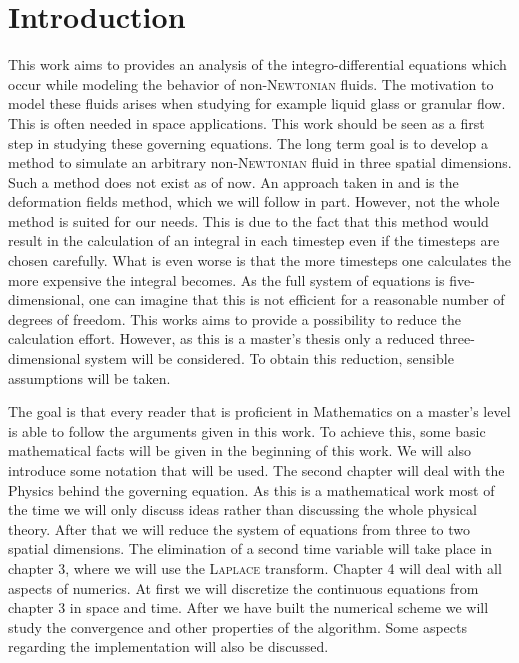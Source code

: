 \documentclass[12pt,a4paper,twoside, open=right]{scrreprt}
\theoremstyle{definition}
\theoremstyle{plain}
\begin{document}
\chapter{Introduction}
This work aims to provides an analysis of the integro-differential equations which occur while modeling the behavior of non-\textsc{Newtonian} fluids. The motivation to model these fluids arises when studying for example liquid glass or granular flow. This is often needed in space applications. This work should be seen as a first step in studying these governing equations. The long term goal is to develop a method to simulate an arbitrary non-\textsc{Newtonian} fluid in three spatial dimensions. Such a method does not exist as of now. An approach taken in \cite{Hulsen2001} and \cite{Hulsen2018} is the deformation fields method, which we will follow in part. However, not the whole method is suited for our needs. This is due to the fact that this method would result in the calculation of an integral in each timestep even if the timesteps are chosen carefully. What is even worse is that the more timesteps one calculates the more expensive the integral becomes. As the full system of equations is five-dimensional, one can imagine that this is not efficient for a reasonable number of degrees of freedom. This works aims to provide a possibility to reduce the calculation effort. However, as this is a master's thesis only a reduced three-dimensional system will be considered. To obtain this reduction, sensible assumptions will be taken.
\\
\par 
The goal is that every reader that is proficient in Mathematics on a master's level is able to follow the arguments given in this work. To achieve this, some basic mathematical facts will be given in the beginning of this work. We will also introduce some notation that will be used. The second chapter will deal with the Physics behind the governing equation. As this is a mathematical work most of the time we will only discuss ideas rather than discussing the whole physical theory. After that we will reduce the system of equations from three to two spatial dimensions. The elimination of a second time variable will take place in chapter 3, where we will use the \textsc{Laplace} transform. Chapter 4 will deal with all aspects of numerics. At first we will discretize the continuous equations from chapter 3 in space and time. After we have built the numerical scheme we will study the convergence and other properties of the algorithm. Some aspects regarding the implementation will also be discussed.\\
\end{document}
